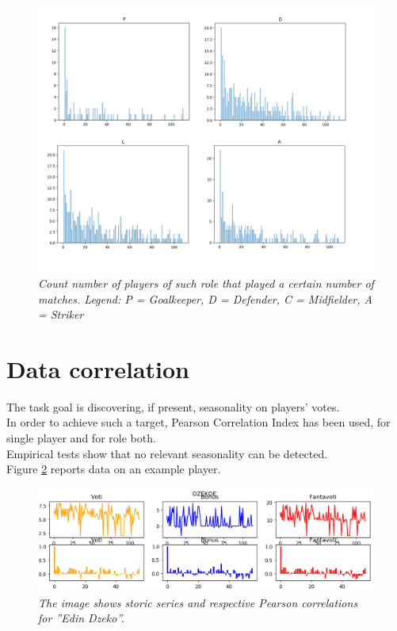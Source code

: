 \begin{figure}[H]
  \includegraphics[scale=0.4]{images/img-02.png}
   \caption{\textit{Count number of players of such role that played a certain number of matches.
   Legend: P = Goalkeeper, D = Defender, C = Midfielder, A = Striker}}
  \label{fig:countMatchPerRole}
\end{figure}

\newpage
\section{Data correlation}

The task goal is discovering, if present, seasonality on players' votes.
\\
In order to achieve such a target, Pearson Correlation Index has been used, for single player and for role both.
\\
Empirical tests show that no relevant seasonality can be detected.
\\
Figure \ref{fig:playereg} reports data on an example player.

\begin{figure}[H]
  \includegraphics[scale=0.5]{images/img-03.png}
   \caption{\textit{The image shows storic series and respective Pearson correlations for ''Edin Dzeko''.}}
  \label{fig:playereg}
\end{figure}

